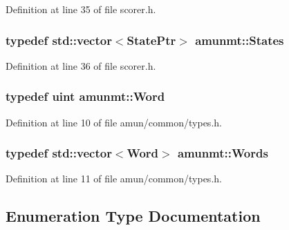 Definition at line 35 of file scorer.\+h.

\subsubsection[{\texorpdfstring{States}{States}}]{\setlength{\rightskip}{0pt plus 5cm}typedef std\+::vector$<${\bf State\+Ptr}$>$ {\bf amunmt\+::\+States}}\hypertarget{namespaceamunmt_a4fe2912e208820f8217fbcf229ebacf7}{}\label{namespaceamunmt_a4fe2912e208820f8217fbcf229ebacf7}


Definition at line 36 of file scorer.\+h.

\subsubsection[{\texorpdfstring{Word}{Word}}]{\setlength{\rightskip}{0pt plus 5cm}typedef uint {\bf amunmt\+::\+Word}}\hypertarget{namespaceamunmt_a07c85682e789f72cc2fbbc3caf7d3800}{}\label{namespaceamunmt_a07c85682e789f72cc2fbbc3caf7d3800}


Definition at line 10 of file amun/common/types.\+h.

\subsubsection[{\texorpdfstring{Words}{Words}}]{\setlength{\rightskip}{0pt plus 5cm}typedef std\+::vector$<${\bf Word}$>$ {\bf amunmt\+::\+Words}}\hypertarget{namespaceamunmt_aa50d0b3a5ba58ba5da8a4d88ddab1b18}{}\label{namespaceamunmt_aa50d0b3a5ba58ba5da8a4d88ddab1b18}


Definition at line 11 of file amun/common/types.\+h.



\subsection{Enumeration Type Documentation}
